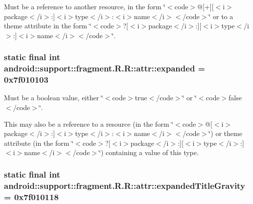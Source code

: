 Must be a reference to another resource, in the form \char`\"{}$<$code$>$@\mbox{[}+\mbox{]}\mbox{[}$<$i$>$package$<$/i$>$:\mbox{]}$<$i$>$type$<$/i$>$:$<$i$>$name$<$/i$>$$<$/code$>$\char`\"{} or to a theme attribute in the form \char`\"{}$<$code$>$?\mbox{[}$<$i$>$package$<$/i$>$:\mbox{]}\mbox{[}$<$i$>$type$<$/i$>$:\mbox{]}$<$i$>$name$<$/i$>$$<$/code$>$\char`\"{}. \hypertarget{classandroid_1_1support_1_1fragment_1_1_r_1_1attr_a3f3be4000699692d3fea6d1bfc89091}{
\subsubsection[{expanded}]{\setlength{\rightskip}{0pt plus 5cm}static final int android::support::fragment.R.R::attr::expanded = 0x7f010103}}
\label{classandroid_1_1support_1_1fragment_1_1_r_1_1attr_a3f3be4000699692d3fea6d1bfc89091}


Must be a boolean value, either \char`\"{}$<$code$>$true$<$/code$>$\char`\"{} or \char`\"{}$<$code$>$false$<$/code$>$\char`\"{}. 

This may also be a reference to a resource (in the form \char`\"{}$<$code$>$@\mbox{[}$<$i$>$package$<$/i$>$:\mbox{]}$<$i$>$type$<$/i$>$:$<$i$>$name$<$/i$>$$<$/code$>$\char`\"{}) or theme attribute (in the form \char`\"{}$<$code$>$?\mbox{[}$<$i$>$package$<$/i$>$:\mbox{]}\mbox{[}$<$i$>$type$<$/i$>$:\mbox{]}$<$i$>$name$<$/i$>$$<$/code$>$\char`\"{}) containing a value of this type. \hypertarget{classandroid_1_1support_1_1fragment_1_1_r_1_1attr_d6ace50ee3d0be677689db7972221180}{
\subsubsection[{expandedTitleGravity}]{\setlength{\rightskip}{0pt plus 5cm}static final int android::support::fragment.R.R::attr::expandedTitleGravity = 0x7f010118}}
\label{classandroid_1_1support_1_1fragment_1_1_r_1_1attr_d6ace50ee3d0be677689db7972221180}


